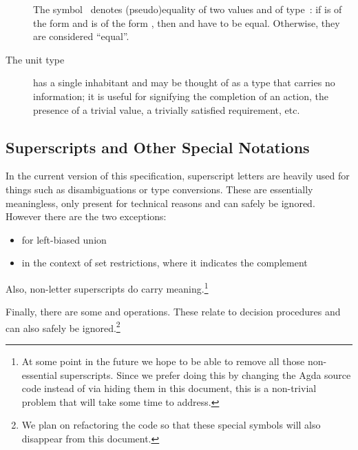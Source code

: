 \begin{description}
The symbol~\AgdaDatatype{\sim} denotes (pseudo)equality of two values  and
 of type~\AgdaSpace{}: if
 is of the form
\AgdaSpace{} and  is
of the form \AgdaSpace{}, then
 and  have to be equal. Otherwise, they are
considered ``equal''.
\item[The unit type]  has a single inhabitant  and may be thought
of as a type that carries no information; it is useful for signifying the completion of an action, the
presence of a trivial value, a trivially satisfied requirement, etc.
\end{description}

\subsection{Superscripts and Other Special Notations}
\label{sec:superscripts-other-special-notation}
In the current version of this specification, superscript letters are
heavily used for things such as disambiguations or type
conversions. These are essentially meaningless, only present for
technical reasons and can safely be ignored. However there are the
two exceptions:
\begin{itemize}[itemsep=\itmsep]
\item {} for left-biased union
\item {} in the context of set restrictions, where it indicates the complement
\end{itemize}
Also, non-letter superscripts do carry meaning.\footnote{At some point in the future we
  hope to be able to remove all those non-essential superscripts.  Since we prefer doing
  this by changing the Agda source code instead of via hiding them in this document, this
  is a non-trivial problem that will take some time to address.}

Finally, there are some  and  operations.
These relate to decision procedures and can also safely be ignored.\footnote{We
  plan on refactoring the code so that these special symbols will also disappear
  from this document.}
